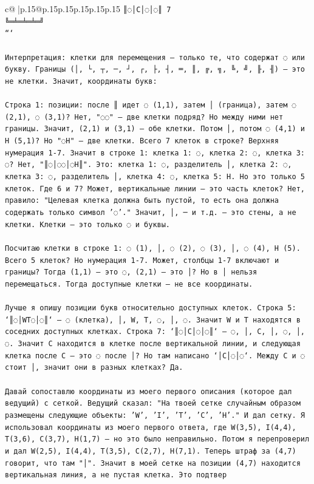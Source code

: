 \documentclass{article}
\begin{document}
{\begin{supertabular}{c@{$\;$}|p{.15\linewidth}@{}p{.15\linewidth}p{.15\linewidth}p{.15\linewidth}p{.15\linewidth}p{.15\linewidth}}
{{{\texttt{║◌│C│◌│◌║ 7} \\
\texttt{╚═╧═╧═╧═╝} \\
\texttt{```} \\
\\ 
\texttt{Интерпретация: клетки для перемещения — только те, что содержат ◌ или букву. Границы (│, └, ┬, ─, ┘, ┌, ├, ┤, ═, ║, ╔, ╗, ╚, ╝, ╟, ╢) — это не клетки. Значит, координаты букв:} \\
\\ 
\texttt{Строка 1: позиции: после ║ идет ◌ (1,1), затем │ (граница), затем ◌ (2,1), ◌ (3,1)? Нет, "◌◌" — две клетки подряд? Но между ними нет границы. Значит, (2,1) и (3,1) — обе клетки. Потом │, потом ◌ (4,1) и H (5,1)? Но "◌H" — две клетки. Всего 7 клеток в строке? Верхняя нумерация 1{-}7. Значит в строке 1: клетка 1: ◌, клетка 2: ◌, клетка 3: ◌? Нет, "║◌│◌◌│◌H║". Это: клетка 1: ◌, разделитель │, клетка 2: ◌, клетка 3: ◌, разделитель │, клетка 4: ◌, клетка 5: H. Но это только 5 клеток. Где 6 и 7? Может, вертикальные линии — это часть клеток? Нет, правило: "Целевая клетка должна быть пустой, то есть она должна содержать только символ '◌'." Значит, │, ─ и т.д. — это стены, а не клетки. Клетки — это только ◌ и буквы.} \\
\\ 
\texttt{Посчитаю клетки в строке 1: ◌ (1), │, ◌ (2), ◌ (3), │, ◌ (4), H (5). Всего 5 клеток? Но нумерация 1{-}7. Может, столбцы 1{-}7 включают и границы? Тогда (1,1) — это ◌, (2,1) — это │? Но в │ нельзя перемещаться. Тогда доступные клетки — не все координаты.} \\
\\ 
\texttt{Лучше я опишу позиции букв относительно доступных клеток. Строка 5: `║◌│WT◌│◌║` — ◌ (клетка), │, W, T, ◌, │, ◌. Значит W и T находятся в соседних доступных клетках. Строка 7: `║◌│C│◌│◌║` — ◌, │, C, │, ◌, │, ◌. Значит C находится в клетке после вертикальной линии, и следующая клетка после C — это ◌ после │? Но там написано `│C│◌│◌`. Между C и ◌ стоит │, значит они в разных клетках? Да.} \\
\\ 
\texttt{Давай сопоставлю координаты из моего первого описания (которое дал ведущий) с сеткой. Ведущий сказал: "На твоей сетке случайным образом размещены следующие объекты: 'W', 'I', 'T', 'C', 'H'." И дал сетку. Я использовал координаты из моего первого ответа, где W(3,5), I(4,4), T(3,6), C(3,7), H(1,7) — но это было неправильно. Потом я перепроверил и дал W(2,5), I(4,4), T(3,5), C(2,7), H(7,1). Теперь штраф за (4,7) говорит, что там "│". Значит в моей сетке на позиции (4,7) находится вертикальная линия, а не пустая клетка. Это подтвер} \\
            }
        }
    }
     \\ \\


\end{supertabular}}
\end{document}
